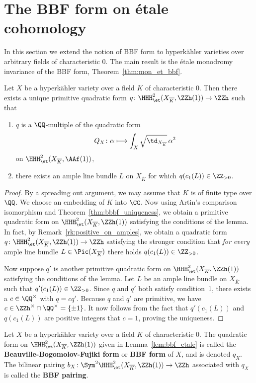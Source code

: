 \section{The BBF form on \'etale cohomology}
In this section we extend the notion of BBF form to hyperk\"ahler varieties over arbitrary fields of characteristic $0$. The main result is the \'etale monodromy invariance of the BBF form, Theorem~\ref{thm:mon_et_bbf}.
\begin{lemma}\label{lem:bbf_etale}
Let $X$ be a hyperk\"ahler variety over a field $K$ of characteristic $0$. Then there exists a unique primitive quadratic form $q\colon \HHH_{\et}^2(X_{\overline{K}},\ZZh(1)) \rightarrow \ZZh$ such that
\begin{enumerate}
\item $q$ is a $\QQ$-multiple of the quadratic form
$$
Q_{X}\colon \alpha \longmapsto \int_X \sqrt{\td_{X_{\overline{K}}}} \, \alpha^2
$$
on $\HHH^2_{\et}(X_{\overline{K}},\AAf(1))$,
\item there exists an ample line bundle $L$ on $X_{\overline{K}}$ for which $q(c_1(L)) \in \ZZ_{> 0}$.
\end{enumerate}
\end{lemma}
\begin{proof}
By a spreading out argument, we may assume that $K$ is of finite type over $\QQ$. We choose an embedding of $K$ into $\CC$. Now using Artin's comparison isomorphism and Theorem~\ref{thm:bbbf_uniqueness}, we obtain a primitive quadratic form on $\HHH^2_{\et}(X_{\overline{K}},\ZZh(1))$ satisfying the conditions of the lemma. In fact, by Remark~\ref{rk:positive_on_amples}, we obtain a quadratic form $q\colon \HHH^2_{\et}(X_{\overline{K}},\ZZh(1)) \rightarrow \ZZh$ satisfying the stronger condition that \emph{for every} ample line bundle $L \in \Pic(X_{\overline{K}})$ there holds $q(c_1(L)) \in \ZZ_{> 0}$.

Now suppose $q'$ is another primitive quadratic form on $\HHH^2_{\et}(X_{\overline{K}},\ZZh(1))$ satisfying the conditions of the lemma. Let $L$ be an ample line bundle on $X_{\overline{K}}$ such that $q'(c_1(L)) \in \ZZ_{> 0}$. Since $q$ and $q'$ both satisfy condition~1, there exists a $c \in \QQ^{\times}$ with $q = c q'$. Because $q$ and $q'$ are primitive, we have $c \in \ZZh^{\times} \cap \QQ^{\times} = \{ \pm 1\}$. It now follows from the fact that $q'(c_1(L))$ and $q(c_1(L))$ are positive integers that $c = 1$, proving the uniqueness.
\end{proof}

\begin{definition}\label{def:etbbf}
Let $X$ be a hyperk\"ahler variety over a field $K$ of characteristic $0$. The quadratic form on $\HHH^2_{\et}(X_{\overline{K}},\ZZh(1))$ given in Lemma~\ref{lem:bbf_etale} is called the {\bfseries Beauville-Bogomolov-Fujiki form} or {\bfseries BBF form} of $X$, and is denoted $q_X$. The bilinear pairing $b_X\colon \Sym^2 \HHH^2_{\et}(X_{\overline{K}},\ZZh(1)) \rightarrow \ZZh$ associated with $q_X$ is called the {\bfseries BBF pairing}.
\end{definition}

